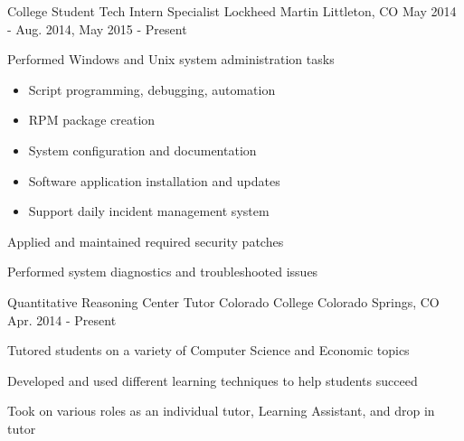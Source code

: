 


\begin{cventries}

\vspace{-.25em}
\cventry
{College Student Tech Intern Specialist} %
{Lockheed Martin} %
{Littleton, CO} %
{May 2014 - Aug. 2014, May 2015 - Present} %
{ %
\begin{cvitems}
\item {Performed Windows and Unix system administration tasks}
  \begin{itemize}
  \item{Script programming, debugging, automation}
  \item{RPM package creation}
  \item{System configuration and documentation}
  \item{Software application installation and updates}
  \item{Support daily incident management system}
  \end{itemize}
\item {Applied and maintained required security patches}
\item {Performed system diagnostics and troubleshooted issues}
\end{cvitems}
}


\vspace{-1.25em}
\cventry
{Quantitative Reasoning Center Tutor} %
{Colorado College} %
{Colorado Springs, CO} %
{Apr. 2014 - Present} %
{ %
\begin{cvitems}
\item {Tutored students on a variety of Computer Science and Economic topics}
\item {Developed and used different learning techniques to help students succeed}
\item {Took on various roles as an individual tutor, Learning Assistant, and drop in tutor}
\end{cvitems}
}


\end{cventries}
